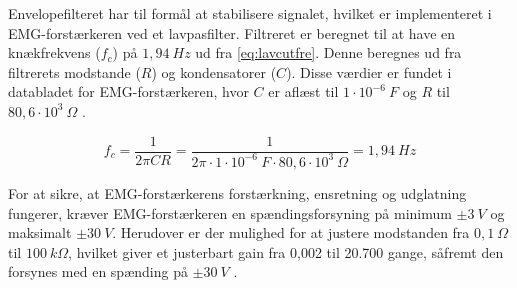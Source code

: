 Envelopefilteret har til formål at stabilisere signalet, hvilket er implementeret i EMG-forstærkeren ved et lavpasfilter. 
Filtreret er beregnet til at have en knækfrekvens ($f_c$) på $1,94~Hz$ ud fra \autoref{eq:lavcutfre}. 
Denne  beregnes ud fra filtrerets modstande ($R$) og kondensatorer ($C$). 
Disse værdier er fundet i databladet for EMG-forstærkeren, hvor $C$ er aflæst til $1 \cdot 10^{-6}~F$ og $R$ til $80,6 \cdot 10^3~\Omega$ \citep{advancertech2013}. 

\begin{equation}\label{eq:lavcutfre}
f_c = \frac{1}{2 \pi C R} = \frac{1}{2 \pi \cdot 1 \cdot 10^{-6}~F \cdot 80,6 \cdot 10^3~\Omega} = 1,94~Hz
\end{equation}

\noindent
For at sikre, at EMG-forstærkerens forstærkning, ensretning og udglatning fungerer, kræver EMG-forstærkeren en spændingsforsyning på minimum $\pm 3~V$ og maksimalt $\pm 30~V$. Herudover er der mulighed for at justere modstanden fra $0,1~\Omega$ til $100~k\Omega$, hvilket giver et justerbart gain fra 0,002 til 20.700 gange, såfremt den forsynes med en spænding på $\pm 30~V$ \citep{advancertech2013}. 